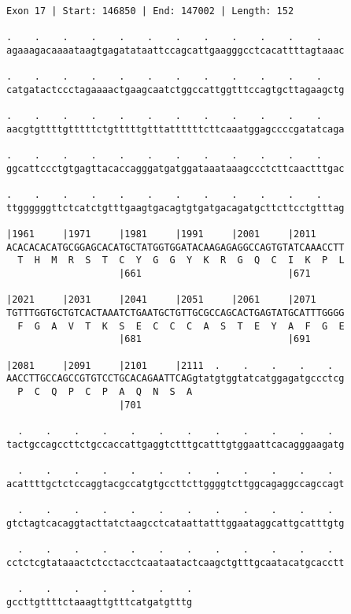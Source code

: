 \documentclass{article}
\begin{document}
\begin{Verbatim}
Exon 17 | Start: 146850 | End: 147002 | Length: 152
 
.    .    .    .    .    .    .    .    .    .    .    .    
agaaagacaaaataagtgagatataattccagcattgaagggcctcacattttagtaaac
  
.    .    .    .    .    .    .    .    .    .    .    .    
catgatactccctagaaaactgaagcaatctggccattggtttccagtgcttagaagctg
  
.    .    .    .    .    .    .    .    .    .    .    .    
aacgtgttttgtttttctgtttttgtttattttttcttcaaatggagccccgatatcaga
  
.    .    .    .    .    .    .    .    .    .    .    .    
ggcattccctgtgagttacaccagggatgatggataaataaagccctcttcaactttgac
  
.    .    .    .    .    .    .    .    .    .    .    .    
ttggggggttctcatctgtttgaagtgacagtgtgatgacagatgcttcttcctgtttag
  
|1961     |1971     |1981     |1991     |2001     |2011     
ACACACACATGCGGAGCACATGCTATGGTGGATACAAGAGAGGCCAGTGTATCAAACCTT
  T  H  M  R  S  T  C  Y  G  G  Y  K  R  G  Q  C  I  K  P  L
                    |661                          |671      
  
|2021     |2031     |2041     |2051     |2061     |2071     
TGTTTGGTGCTGTCACTAAATCTGAATGCTGTTGCGCCAGCACTGAGTATGCATTTGGGG
  F  G  A  V  T  K  S  E  C  C  C  A  S  T  E  Y  A  F  G  E
                    |681                          |691      
  
|2081     |2091     |2101     |2111  .    .    .    .    .  
AACCTTGCCAGCCGTGTCCTGCACAGAATTCAGgtatgtggtatcatggagatgccctcg
  P  C  Q  P  C  P  A  Q  N  S  A                           
                    |701                                    
  
  .    .    .    .    .    .    .    .    .    .    .    .  
tactgccagccttctgccaccattgaggtctttgcatttgtggaattcacagggaagatg
  
  .    .    .    .    .    .    .    .    .    .    .    .  
acattttgctctccaggtacgccatgtgccttcttggggtcttggcagaggccagccagt
  
  .    .    .    .    .    .    .    .    .    .    .    .  
gtctagtcacaggtacttatctaagcctcataattatttggaataggcattgcatttgtg
  
  .    .    .    .    .    .    .    .    .    .    .    .  
cctctcgtataaactctcctacctcaataatactcaagctgtttgcaatacatgcacctt
  
  .    .    .    .    .    .    .
gccttgttttctaaagttgtttcatgatgtttg
\end{Verbatim}
\end{document}
